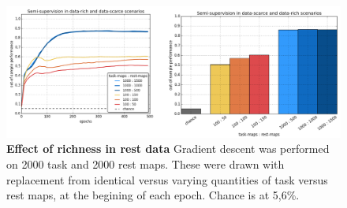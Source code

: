 \documentclass{article} %
\begin{document}
\begin{figure}
\begin{centering}
\includegraphics[width=1.00\textwidth]{figures/semisup_both.png}
\end{centering}
\vspace{-0.5cm}
\caption{\textbf{Effect of richness in rest data}
Gradient descent was performed on 2000 task and 2000 rest maps.
These were drawn with replacement from identical versus varying
quantities of task versus rest maps, at the begining of each epoch.
Chance is at 5,6\%.
}
\label{fig_semisup}
\end{figure}
\end{document}
